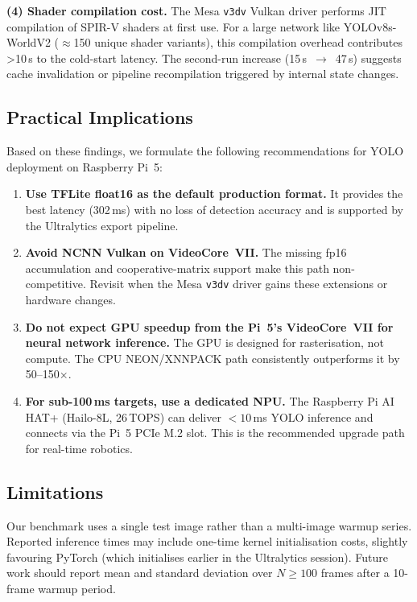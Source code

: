\documentclass[conference]{IEEEtran}
\begin{document}
\textbf{(4) Shader compilation cost.}
The Mesa \texttt{v3dv} Vulkan driver performs JIT compilation of SPIR-V
shaders at first use. For a large network like YOLOv8s-WorldV2
($\approx$150 unique shader variants), this compilation overhead
contributes \textgreater10\,s to the cold-start latency. The second-run
increase (15\,s~$\to$~47\,s) suggests cache invalidation or
pipeline recompilation triggered by internal state changes.

\subsection{Practical Implications}

Based on these findings, we formulate the following recommendations for
YOLO deployment on Raspberry Pi~5:

\begin{enumerate}
  \item \textbf{Use TFLite float16 as the default production format.}
        It provides the best latency (302\,ms) with no loss of detection
        accuracy and is supported by the Ultralytics export pipeline.

  \item \textbf{Avoid NCNN Vulkan on VideoCore~VII.}
        The missing fp16 accumulation and cooperative-matrix support
        make this path non-competitive. Revisit when the Mesa
        \texttt{v3dv} driver gains these extensions or hardware changes.

  \item \textbf{Do not expect GPU speedup from the Pi~5's VideoCore~VII
        for neural network inference.}
        The GPU is designed for rasterisation, not compute. The CPU
        NEON/XNNPACK path consistently outperforms it by 50--150$\times$.

  \item \textbf{For sub-100\,ms targets, use a dedicated NPU.}
        The Raspberry Pi AI HAT+ (Hailo-8L, 26\,TOPS) can deliver
        $<10$\,ms YOLO inference and connects via the Pi~5 PCIe M.2 slot.
        This is the recommended upgrade path for real-time robotics.
\end{enumerate}

\subsection{Limitations}

Our benchmark uses a single test image rather than a multi-image warmup
series. Reported inference times may include one-time kernel
initialisation costs, slightly favouring PyTorch (which initialises
earlier in the Ultralytics session). Future work should report
mean and standard deviation over $N \geq 100$ frames after a 10-frame
warmup period.
\end{document}
